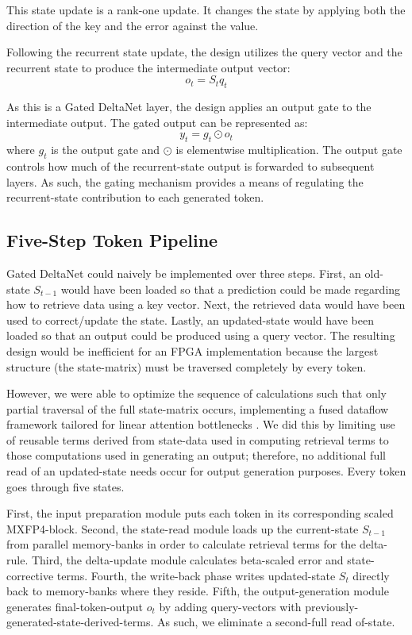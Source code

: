 \documentclass[conference]{IEEEtran}
\begin{document}
This state update is a rank-one update. It changes the state by applying both the direction of the key and the error against the value.

Following the recurrent state update, the design utilizes the query vector and the recurrent state to produce the intermediate output vector:
\begin{equation}
o_t = S_t q_t
\end{equation}

As this is a Gated DeltaNet layer, the design applies an output gate to the intermediate output. The gated output can be represented as:
\begin{equation}
y_t = g_t \odot o_t
\end{equation}
where $g_t$ is the output gate and $\odot$ is elementwise multiplication. The output gate controls how much of the recurrent-state output is forwarded to subsequent layers. As such, the gating mechanism provides a means of regulating the recurrent-state contribution to each generated token.

\subsection{Five-Step Token Pipeline}
Gated DeltaNet could naively be implemented over three steps. First, an old-state $S_{t-1}$ would have been loaded so that a prediction could be made regarding how to retrieve data using a key vector. Next, the retrieved data would have been used to correct/update the state. Lastly, an updated-state would have been loaded so that an output could be produced using a query vector. The resulting design would be inefficient for an FPGA implementation because the largest structure (the state-matrix) must be traversed completely by every token.

However, we were able to optimize the sequence of calculations such that only partial traversal of the full state-matrix occurs, implementing a fused dataflow framework tailored for linear attention bottlenecks \cite{b10}. We did this by limiting use of reusable terms derived from state-data used in computing retrieval terms to those computations used in generating an output; therefore, no additional full read of an updated-state needs occur for output generation purposes. Every token goes through five states.

First, the input preparation module puts each token in its corresponding scaled MXFP4-block. Second, the state-read module loads up the current-state $S_{t-1}$ from parallel memory-banks in order to calculate retrieval terms for the delta-rule. Third, the delta-update module calculates beta-scaled error and state-corrective terms. Fourth, the write-back phase writes updated-state $S_t$ directly back to memory-banks where they reside. Fifth, the output-generation module generates final-token-output $o_t$ by adding query-vectors with previously-generated-state-derived-terms. As such, we eliminate a second-full read of-state.
\end{document}
